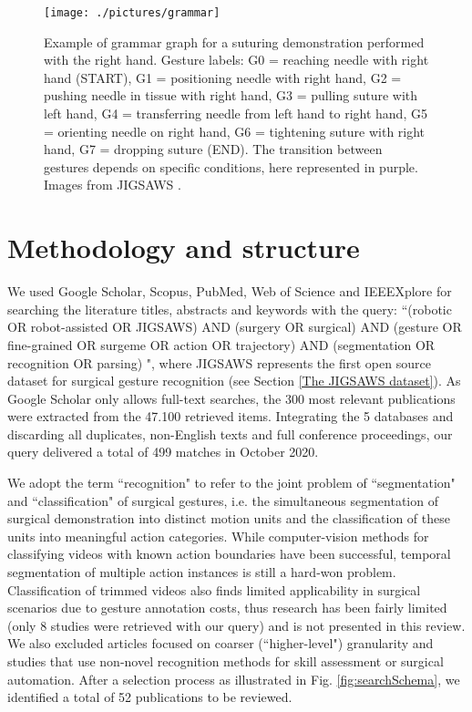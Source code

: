 \documentclass[journal]{IEEEtran}
\begin{document}
\begin{figure*}[t]
	\centering
	\texttt{[image: ./pictures/grammar]}
	\caption[Suturing grammar graph.]{Example of grammar graph for a suturing demonstration performed with the right hand. 
	Gesture labels: 
	G0 = reaching needle with right hand (START),
	G1 = positioning needle with right hand,
	G2 = pushing needle in tissue with right hand,
    G3 = pulling suture with left hand,
    G4 = transferring needle from left hand to right hand,
    G5 = orienting needle on right hand,
    G6 = tightening suture with right hand,
    G7 = dropping suture (END).
    The transition between gestures depends on specific conditions, here represented in purple.
    Images from JIGSAWS \cite{Ahmidi2017}.}
	\label{fig:grammar}
\end{figure*}

\section{Methodology and structure} \label{Structure}

We used Google Scholar, Scopus, PubMed, Web of Science and IEEEXplore for searching the literature titles, abstracts and keywords with the query: ``(robotic  OR  robot-assisted  OR  JIGSAWS)  AND  (surgery OR surgical)  AND  (gesture OR fine-grained OR surgeme OR action OR trajectory)  AND  (segmentation OR recognition OR parsing) ", where JIGSAWS represents the first open source dataset for surgical gesture recognition (see Section \ref{The JIGSAWS dataset}). As Google Scholar only allows full-text searches, the 300 most relevant publications were extracted from the 47.100 retrieved items. Integrating the 5 databases and discarding all duplicates, non-English texts and full conference proceedings, our query delivered a total of 499 matches in October 2020.

We adopt the term ``recognition" to refer to the joint problem of ``segmentation" and ``classification" of surgical gestures, i.e. the simultaneous segmentation of surgical demonstration into distinct motion units and the classification of these units into meaningful action categories. 
While computer-vision methods for classifying videos with known action boundaries have been successful, temporal segmentation of multiple action instances is still a hard-won problem. Classification of trimmed videos also finds limited applicability in surgical scenarios due to gesture annotation costs, thus research has been fairly limited (only 8 studies were retrieved with our query) and is not presented in this review.  
We also excluded articles focused on coarser (``higher-level") granularity and studies that use non-novel recognition methods for skill assessment or surgical automation.  
After a selection process as illustrated in Fig. \ref{fig:searchSchema}, we identified a total of 52 publications to be reviewed. 
\end{document}
